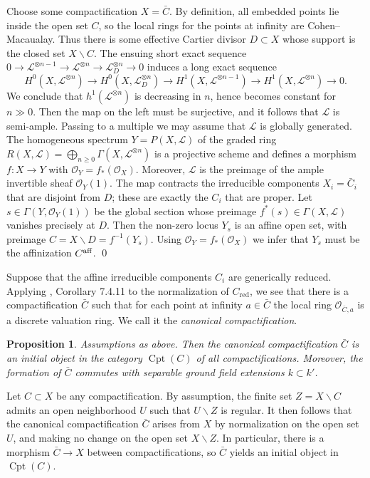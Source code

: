 \documentclass[oneside, 12pt]{amsart}
\newcommand\mylabel[1]{\label{#1}\marginpar{\vspace{-1ex}\medskip\medskip\footnotesize \tt #1}}
\renewcommand\mylabel[1]{\label{#1}}
\newtheorem{proposition}[theorem]{Proposition}
\theoremstyle{definition}
\theoremstyle{remark}
\newcommand{\shL}{\mathscr{L}}
\newcommand{\aff}{\text{\rm aff}}
\newcommand{\lra}{\longrightarrow}
\renewcommand{\O}{\mathscr{O}}
\newcommand{\ra}{\rightarrow}
\newcommand{\red}{{\operatorname{red}}}
\newcommand{\Cpt}{\operatorname{Cpt}}
\begin{document}
\proof
Choose some compactification $X=\bar{C}$. By definition, all embedded points lie inside the open set $C$,
so the local rings for the points at infinity are Cohen--Macaualay. Thus there is  some effective Cartier divisor $D\subset X$ whose support
is the closed set $X\smallsetminus C$. The ensuing short exact sequence $0\ra\shL^{\otimes n-1}\ra \shL^{\otimes n}\ra\shL_D^{\otimes n}\ra 0$
induces a long exact sequence
$$
H^0(X,\shL^{\otimes n})\lra H^0(X,\shL^{\otimes n}_D)\lra H^1(X, \shL^{\otimes n-1})\lra H^1(X, \shL^{\otimes n})\lra 0.
$$
We conclude that $h^1(\shL^{\otimes n})$ is decreasing in $n$, hence becomes constant for $n\gg 0$.
Then the map on the left must be surjective, and it follows that $\shL$ is semi-ample. Passing to a multiple
we may assume that $\shL$ is globally generated.
The homogeneous spectrum $Y=P(X,\shL)$ of the graded ring $R(X,\shL)=\bigoplus_{n\geq 0} \Gamma(X,\shL^{\otimes n})$
is a projective scheme and defines a morphism $f:X\ra Y$ with $\O_Y=f_*(\O_X)$. Moreover, $\shL$ is the preimage of the ample invertible sheaf $\O_Y(1)$.
The map contracts the irreducible components $X_i=\bar{C}_i$ that are disjoint from $D$; these  are exactly
the $C_i$ that are   proper. Let $s\in\Gamma(Y,\O_Y(1))$ be the global section whose preimage $f^*(s)\in\Gamma(X,\shL)$ vanishes precisely at $D$.
Then the non-zero locus $Y_s$ is an affine open set, with preimage $C=X\smallsetminus D=f^{-1}(Y_s)$.
Using $\O_Y=f_*(\O_X)$ we infer that $Y_s$ must be the affinization $C^\aff$.
\qed

\medskip
Suppose that the affine irreducible components $C_i$ are generically reduced.
Applying \cite{EGA II}, Corollary 7.4.11 to the normalization of $C_\red$, we see that there is a compactification $\bar{C}$
such that for each point at infinity $a\in \bar{C}$ the local ring $\O_{\bar{C},a}$ is a discrete valuation ring.
We call it the \emph{canonical compactification}. 

\begin{proposition}
\mylabel{canonical compactification}
Assumptions as above. Then the  canonical compactification $\bar{C}$ is an  initial object in the category $\Cpt(C)$
of all compactifications. Moreover, the formation of $\bar{C}$ commutes with separable ground field
extensions $k\subset k'$.
\end{proposition}

\proof
Let $C\subset X$ be any compactification. By assumption, the finite set $Z=X\smallsetminus C$ admits
an open neighborhood $U$ such that $U\smallsetminus Z$ is regular. It then follows that the canonical compactification
$\bar{C}$ arises from $X$ by normalization on the open set $U$, and making no change on the open set $X\smallsetminus Z$.
In particular, there is a morphism $\bar{C}\ra X$ between compactifications, so $\bar{C}$ yields an initial object in $\Cpt(C)$.
\end{document}
